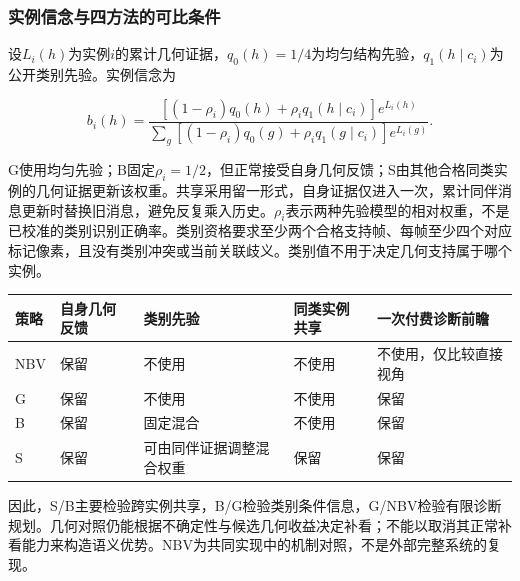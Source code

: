 \documentclass[11pt,a4paper]{article}
\newlength{\ReviewTableWidth}
\numberwithin{equation}{section}
\begin{document}
\hypertarget{ux5b9eux4f8bux4fe1ux5ff5ux4e0eux56dbux65b9ux6cd5ux7684ux53efux6bd4ux6761ux4ef6}{%
\subsubsection{实例信念与四方法的可比条件}\label{ux5b9eux4f8bux4fe1ux5ff5ux4e0eux56dbux65b9ux6cd5ux7684ux53efux6bd4ux6761ux4ef6}}

设\(L_i(h)\)为实例\(i\)的累计几何证据，\(q_0(h)=1/4\)为均匀结构先验，\(q_1(h\mid c_i)\)为公开类别先验。实例信念为

\begin{equation}
b_i(h)=\frac{[(1-\rho_i)q_0(h)+\rho_iq_1(h\mid c_i)]e^{L_i(h)}}
{\sum_g[(1-\rho_i)q_0(g)+\rho_iq_1(g\mid c_i)]e^{L_i(g)}}.
\end{equation}

G使用均匀先验；B固定\(\rho_i=1/2\)，但正常接受自身几何反馈；S由其他合格同类实例的几何证据更新该权重。共享采用留一形式，自身证据仅进入一次，累计同伴消息更新时替换旧消息，避免反复乘入历史。\(\rho_i\)表示两种先验模型的相对权重，不是已校准的类别识别正确率。类别资格要求至少两个合格支持帧、每帧至少四个对应标记像素，且没有类别冲突或当前关联歧义。类别值不用于决定几何支持属于哪个实例。

\begin{center}
\small
\setlength{\tabcolsep}{4pt}
\setlength{\ReviewTableWidth}{\dimexpr\linewidth-8\tabcolsep\relax}
\begin{tabular}{@{}>{\raggedright\arraybackslash}p{0.2\ReviewTableWidth} >{\raggedright\arraybackslash}p{0.2\ReviewTableWidth} >{\raggedright\arraybackslash}p{0.2\ReviewTableWidth} >{\raggedright\arraybackslash}p{0.2\ReviewTableWidth} >{\raggedright\arraybackslash}p{0.2\ReviewTableWidth}@{}}
\toprule
策略 & 自身几何反馈 & 类别先验 & 同类实例共享 & 一次付费诊断前瞻 \\
\midrule
NBV & 保留 & 不使用 & 不使用 & 不使用，仅比较直接视角 \\
G & 保留 & 不使用 & 不使用 & 保留 \\
B & 保留 & 固定混合 & 不使用 & 保留 \\
S & 保留 & 可由同伴证据调整混合权重 & 保留 & 保留 \\
\bottomrule
\end{tabular}
\end{center}

因此，S/B主要检验跨实例共享，B/G检验类别条件信息，G/NBV检验有限诊断规划。几何对照仍能根据不确定性与候选几何收益决定补看；不能以取消其正常补看能力来构造语义优势。NBV为共同实现中的机制对照，不是外部完整系统的复现。
\end{document}
